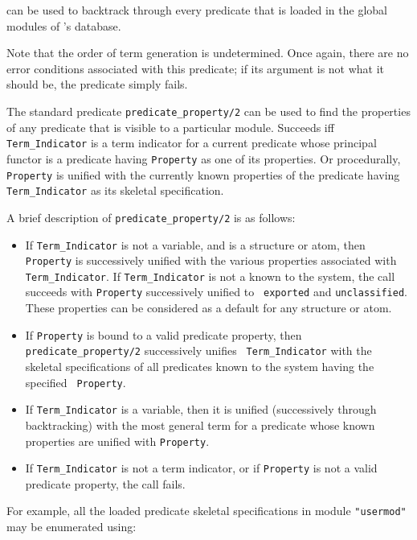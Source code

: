 \begin{description}

    can be used to backtrack through every predicate that is loaded in the
    global modules of \ourprolog's database.

    Note that the order of term generation is undetermined. Once again, 
    there are no error conditions associated with this predicate; if its
    argument is not what it should be, the predicate simply fails.

\label{PredProp}
    The standard predicate {\tt predicate\_property/2} can be used to find 
    the properties of any predicate that is visible to a particular module.
    Succeeds iff {\tt Term\_Indicator} is a term indicator for a current 
    predicate whose principal functor is a predicate having {\tt Property} 
    as one of its properties. Or procedurally, {\tt Property} is unified 
    with the currently known properties of the predicate having 
    {\tt Term\_Indicator} as its skeletal specification.
    
    A brief description of {\tt predicate\_property/2} is as follows:
    \begin{itemize} 
\item If {\tt Term\_Indicator} is not a variable, and is a structure
	or atom, then {\tt Property} is successively unified with the
	various properties associated with {\tt Term\_Indicator}.  If
	{\tt Term\_Indicator} is not a known to the system, the call
	succeeds with {\tt Property} successively unified to {\tt
	exported} and {\tt unclassified}.  These properties can be
	considered as a default for any structure or atom.
\item If {\tt Property} is bound to a valid predicate property, then {\tt
	predicate\_property/2} successively unifies {\tt
	Term\_Indicator} with the skeletal specifications of all
	predicates known to the system having the specified {\tt
	Property}.  
\item If {\tt Term\_Indicator} is a variable, then
	it is unified (successively through backtracking) with the
	most general term for a predicate whose known properties are
	unified with {\tt Property}.  
\item If {\tt Term\_Indicator}
	is not a term indicator, or if {\tt Property} is not a valid
	predicate property, the call fails.  
\end{itemize} 
\noindent
For example, all the loaded predicate skeletal specifications in
module {\tt "usermod"} may be enumerated using:


\end{description}
